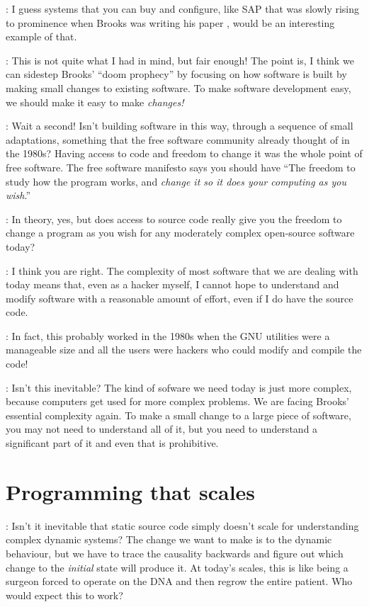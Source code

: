 \documentclass[runningheads]{llncs}
\newcommand{\T}{Tomas}
\newcommand{\J}{Joel}
\newcommand{\says}[2][gg]{\vspace{0.5em}\noindent\hangindent=0.5cm{\textsc{#1}}: #2}
\begin{document}
\says[\T]{I guess systems that you can buy and configure, like SAP that was slowly rising to prominence when Brooks was writing his paper \cite{leimbach-2008-sap}, would be an interesting example of that.}

\says[\J]{This is not quite what I had in mind, but fair enough! The point is, I think we can sidestep Brooks' ``doom prophecy'' by focusing on how software is built by making small changes to existing software. To make software development easy, we should make it easy to make \emph{changes!} }

\says[\T]{Wait a second! Isn't building software in this way, through a sequence of small adaptations, something that the free software community already thought of in the 1980s? Having access to code and freedom to change it was the whole point of free software. The free software manifesto says you should have ``The freedom to study how the program works, and \emph{change it so it does your computing as you wish}.''\cite{fsf-2001-whatis}}

\says[\J]{In theory, yes, but does access to source code really give you the freedom to change a program as you wish for any moderately complex open-source software today?}

\says[\T]{I think you are right. The complexity of most software that we are dealing with today means that, even as a hacker myself, I cannot hope to understand and modify software with a reasonable amount of effort, even if I do have the source code.}

\says[\J]{In fact, this probably worked in the 1980s when the GNU utilities were a manageable size and all the users were hackers who could modify and compile the code!}

\says[\T]{Isn't this inevitable? The kind of sofware we need today is just more complex, because computers get used for more complex problems. We are facing Brooks' essential complexity again. To make a small change to a large piece of software, you may not need to understand all of it, but you need to understand a significant part of it and even that is prohibitive. }

\section{Programming that scales}

\says[\J]{Isn't it inevitable that static source code simply doesn't scale for understanding complex dynamic systems? The change we want to make is to the dynamic behaviour, but we have to trace the causality backwards and figure out which change to the \emph{initial} state will produce it. At today's scales, this is like being a surgeon forced to operate on the DNA and then regrow the entire patient. Who would expect this to work?}
\end{document}
